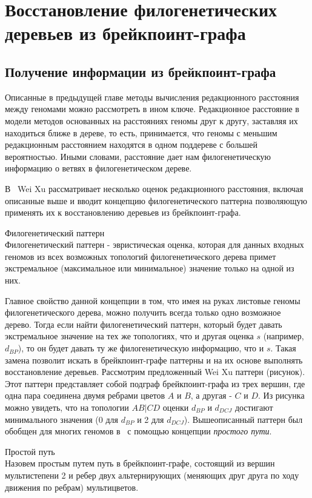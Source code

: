 \chapter{Восстановление филогенетических деревьев из брейкпоинт-графа}

\section{Получение информации из брейкпоинт-графа}
Описанные в предыдущей главе методы вычисления редакционного расстояния между геномами можно рассмотреть в ином ключе.
Редакционное расстояние в модели методов основанных на расстояниях  геномы друг к другу, заставляя их находиться ближе в дереве, то есть,
принимается, что геномы с меньшим редакционным расстоянием находятся в одном поддереве с большей вероятностью.
Иными словами, расстояние дает нам филогенетическую информацию о ветвях в филогенетическом дереве.

В~\cite{xu2010exploring} Wei Xu рассматривает несколько оценок редакционного расстояния, включая описанные выше
и вводит концепцию филогенетического паттерна позволяющую применять их к восстановлению деревьев из брейкпоинт-графа.
\begin{define}{Филогенетический паттерн} \\
  Филогенетический паттерн - эвристическая оценка, которая для данных входных геномов
  из всех возможных топологий филогенетического дерева примет экстремальное (максимальное или минимальное) значение только на одной из них.
\end{define}
Главное свойство данной концепции в том, что имея на руках листовые геномы филогенетического дерева, можно получить всегда только одно возможное дерево.
Тогда если найти филогенетический паттерн, который будет давать экстремальное значение на тех же топологиях, что и другая оценка $s$ (например, $d_{BP}$), то он будет давать ту же филогенетическую информацию, что и $s$.
Такая замена позволит искать в брейкпоинт-графе паттерны и на их основе выполнять восстановление деревьев.
Рассмотрим предложенный Wei Xu паттерн  (рисунок). 
Этот паттерн представляет собой подграф брейкпоинт-графа из трех вершин, где одна пара соединена двумя ребрами цветов $A$ и $B$, а другая - $C$ и $D$.
Из рисунка можно увидеть, что на топологии $AB|CD$ оценки $d_{BP}$ и $d_{DCJ}$ достигают минимального значения (0 для $d_{BP}$ и 2 для $d_{DCJ}$).
Вышеописанный паттерн был обобщен для многих геномов в~\cite{Alekseyev2009} с помощью концепции \textit{простого пути}.
\begin{define}{Простой путь} \\
  Назовем простым путем путь в брейкпоинт-графе, состоящий из вершин мультистепени 2 и ребер двух альтернирующих
  (меняющих друг друга по ходу движения по ребрам) мультицветов.
\end{define}

